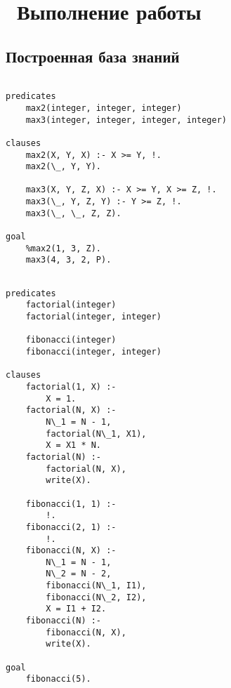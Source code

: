 \chapter{ Выполнение работы}
\label{cha:analysis}

\section{ Построенная база знаний}

\begin{lstlisting}[style=lispStyle, caption={Получение элементов списка с помощью команд car и cdr.},
                    label={lst:max}]

predicates
    max2(integer, integer, integer)
    max3(integer, integer, integer, integer)

clauses
    max2(X, Y, X) :- X >= Y, !.
    max2(\_, Y, Y).

    max3(X, Y, Z, X) :- X >= Y, X >= Z, !.
    max3(\_, Y, Z, Y) :- Y >= Z, !.
    max3(\_, \_, Z, Z).

goal
    %max2(1, 3, Z).
    max3(4, 3, 2, P).


\end{lstlisting}

\begin{lstlisting}[style=lispStyle, caption={Получение элементов списка с помощью команд car и cdr.},
                    label={lst:fact}]
predicates
    factorial(integer)
    factorial(integer, integer)

    fibonacci(integer)
    fibonacci(integer, integer)

clauses
    factorial(1, X) :-
        X = 1.
    factorial(N, X) :-
        N\_1 = N - 1,
        factorial(N\_1, X1),
        X = X1 * N.
    factorial(N) :-
        factorial(N, X),
        write(X).

    fibonacci(1, 1) :-
        !.
    fibonacci(2, 1) :-
        !.
    fibonacci(N, X) :-
        N\_1 = N - 1,
        N\_2 = N - 2,
        fibonacci(N\_1, I1),
        fibonacci(N\_2, I2),
        X = I1 + I2.
    fibonacci(N) :-
        fibonacci(N, X),
        write(X).

goal
    fibonacci(5).

\end{lstlisting}

